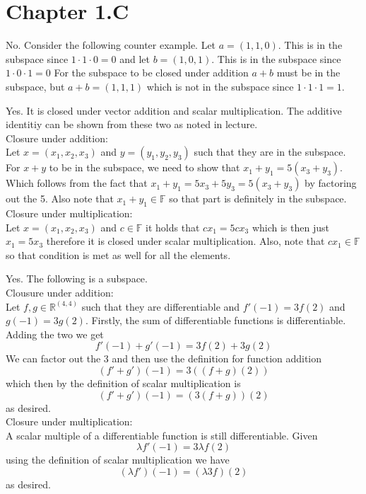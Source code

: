 \documentclass[10pt, twocolumn]{article}
\newcommand{\R}{\mathbb{R}}
\begin{document}
\section*{Chapter 1.C}
\begin{q}[Problem 1(c)]
    No. Consider the following counter example. 
    Let $ a = (1, 1, 0) $. This is in the subspace since $ 1 \cdot 1 \cdot 0 = 0 $ 
    and let  $ b = (1, 0, 1) $. This is in the subspace since $ 1 \cdot 0 \cdot 1 = 0 $ 
    For the subspace to be closed under addition $ a + b $ must be in the subspace, 
    but $ a + b = (1, 1, 1) $ which is not in the subspace since $ 1 \cdot 1 \cdot 1 = 1 $.
\end{q}
\begin{q}[Problem 1(d)]
    Yes. It is closed under vector addition and scalar multiplication. The additive identitiy can be shown from these two as noted in lecture.\\
    Closure under addition: \\
    Let $ x = (x_1, x_2, x_3) $ and $ y = (y_1, y_2, y_3) $ such that they are in the subspace.
    For $ x + y $ to be in the subspace, we need to show that $ x_1 + y_1 = 5(x_3 + y_3) $. 
    Which follows from the fact that $ x_1 + y_1 = 5x_3 + 5y_3 = 5(x_3 + y_3) $  by factoring out the 5. 
    Also note that $ x_1 + y_1 \in \mathbb{F} $ so that part is definitely in the subspace.
    Closure under multiplication: \\
    Let $ x = (x_1, x_2, x_3) $ and $ c \in \mathbb{F} $ it holds that $ c x_1 = 5c x_3 $ which is then just $ x_1 = 5 x_3 $ 
    therefore it is closed under scalar multiplication. Also, note that $ cx_1 \in \mathbb{F} $ so that condition is met as well for all the elements.
\end{q}
\begin{q}[Problem 3]
    Yes. The following is a subspace. \\
    Clousure under addition: \\
    Let $ f, g \in \R^{(4, 4)} $ such that they are differentiable and $ f'(-1) = 3f(2) $ and $ g(-1) = 3g(2) $. 
    Firstly, the sum of differentiable functions is differentiable.
    Adding the two we get $$ f'(-1) + g'(-1) = 3f(2) + 3g(2) $$ 
    We can factor out the 3 and then use the definition for function addition 
    $$ (f'+ g')(-1) = 3((f+g)(2)) $$ which then by the definition of scalar multiplication is 
    $$ (f'+ g')(-1) = (3(f+g))(2) $$ as desired. \\
    Closure under multiplication: \\
    A scalar multiple of a differentiable function is still differentiable. 
    Given
    $$ \lambda f'(-1) = 3 \lambda f(2) $$
    using the definition of scalar multiplication we have
    $$ (\lambda f')(-1) = (\lambda 3 f)(2) $$
    as desired.
\end{q}
\end{document}
